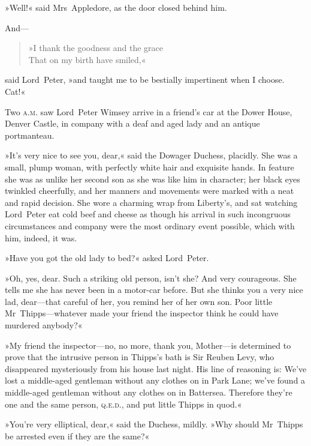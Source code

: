 »Well!« said Mrs~Appledore, as the door closed behind him.

And—

\begin{verse}
»I thank the goodness and the grace\\
That on my birth have smiled,«
\end{verse}

said Lord~Peter, »and taught me to be bestially impertinent when I choose. Cat!«

Two \textsc{a.m.} saw Lord~Peter Wimsey arrive in a friend's car at the Dower House, Denver Castle, in company with a deaf and aged lady and an antique portmanteau.

»It's very nice to see you, dear,« said the Dowager Duchess, placidly. She was a small, plump woman, with perfectly white hair and exquisite hands. In feature she was as unlike her second son as she was like him in character; her black eyes twinkled cheerfully, and her manners and movements were marked with a neat and rapid decision. She wore a charming wrap from Liberty's, and sat watching Lord~Peter eat cold beef and cheese as though his arrival in such incongruous circumstances and company were the most ordinary event possible, which with him, indeed, it was.

»Have you got the old lady to bed?« asked Lord~Peter.

»Oh, yes, dear. Such a striking old person, isn't she? And very courageous. She tells me she has never been in a motor-car before. But she thinks you a very nice lad, dear—that careful of her, you remind her of her own son. Poor little Mr~Thipps—whatever made your friend the inspector think he could have murdered anybody?«

»My friend the inspector—no, no more, thank you, Mother—is determined to prove that the intrusive person in Thipps's bath is Sir Reuben Levy, who disappeared mysteriously from his house last night. His line of reasoning is: We've lost a middle-aged gentleman without any clothes on in Park Lane; we've found a middle-aged gentleman without any clothes on in Battersea. Therefore they're one and the same person, \textsc{q.e.d.}, and put little Thipps in quod.«

»You're very elliptical, dear,« said the Duchess, mildly. »Why should Mr~Thipps be arrested even if they are the same?«

